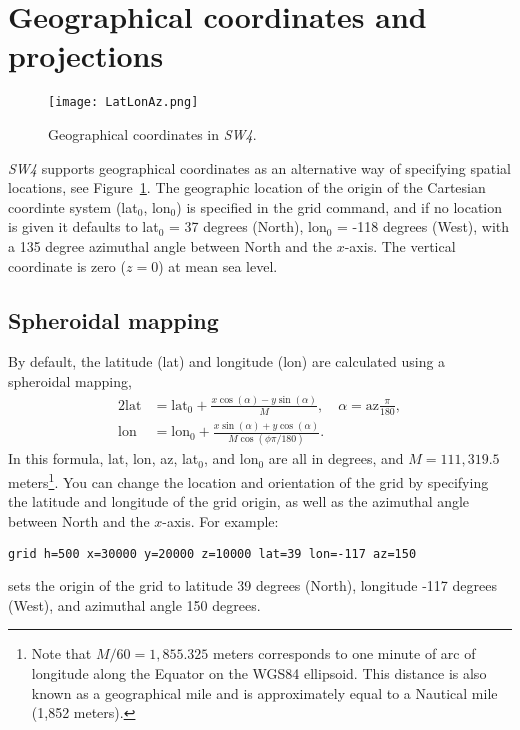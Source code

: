 \documentclass[11pt]{report}
\begin{document}
\section{Geographical coordinates and projections}
\begin{figure}
\begin{centering}
  \texttt{[image: LatLonAz.png]}
  \caption{Geographical coordinates in \emph{SW4}.}
  \label{fig:geocoord}
\end{centering}
\end{figure}
\emph{SW4} supports geographical coordinates as an alternative way of specifying spatial locations,
see Figure~\ref{fig:geocoord}. The geographic location of the origin of the Cartesian coordinte
system (lat$_0$, lon$_0$) is specified in the grid command, and if no location is given it defaults
to lat$_0$ = 37 degrees (North), lon$_0$ = -118 degrees (West), with a 135 degree azimuthal angle
between North and the $x$-axis. The vertical coordinate is zero ($z=0$) at mean sea level. 

\subsection{Spheroidal mapping}
By default, the latitude (lat) and longitude (lon) are calculated using a spheroidal mapping,
\begin{alignat}{2}
\mbox{lat} &= \mbox{lat$_0$} + \frac{x\cos(\alpha) - y\sin(\alpha)}{M},\quad \alpha =
\mbox{az}\frac{\pi}{180}, \label{eq:lat}\\
\mbox{lon} &= \mbox{lon$_0$} + \frac{x\sin(\alpha ) + y\cos(\alpha)}{M\cos(\phi \pi/180)}.\label{eq:lon}
\end{alignat}
In this formula, lat, lon, az, lat$_0$, and lon$_0$ are all in degrees, and $M = 111,319.5$
meters\footnote{Note that $M/60 = 1,855.325$ meters corresponds to one minute of arc of
  longitude along the Equator on the WGS84 ellipsoid. This distance is also known as a geographical
  mile and is approximately equal to a Nautical mile (1,852 meters).}.  You can change the location
and orientation of the grid by specifying the latitude and longitude of the grid origin, as well as
the azimuthal angle between North and the $x$-axis. For example:
\begin{verbatim}
grid h=500 x=30000 y=20000 z=10000 lat=39 lon=-117 az=150
\end{verbatim}
sets the origin of the grid to latitude 39 degrees (North), longitude -117 degrees
(West), and azimuthal angle 150 degrees.
\end{document}
